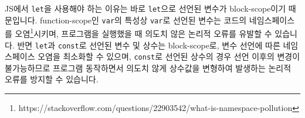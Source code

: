 JS에서 \texttt{let}을 사용해야 하는 이유는 바로 \texttt{let}으로 선언된 변수가 block-scope이기 때문입니다. function-scope인 \texttt{var}의 특성상 \texttt{var}로 선언된 변수는 코드의 네임스페이스를 오염\footnote{https://stackoverflow.com/questions/22903542/what-is-namespace-pollution}시키며, 프로그램을 실행했을 때 의도치 않은 논리적 오류를 유발할 수 있습니다. 반면 \texttt{let}과 \texttt{const}로 선언된 변수 및 상수는 block-scope로, 변수 선언에 따른 네임스페이스 오염을 최소화할 수 있으며, \texttt{const}로 선언된 상수의 경우 선언 이후의 변경이 불가능하므로 프로그램 동작하면서 의도치 않게 상수값을 변형하여 발생하는 논리적 오류를 방지할 수 있습니다. 
